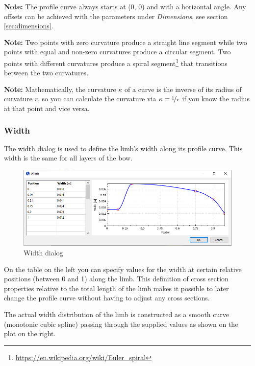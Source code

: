 \documentclass[12pt]{article}
\begin{document}
\bigskip

\textbf{Note:} The profile curve always starts at (0, 0) and with a horizontal angle.
Any offsets can be achieved with the parameters under \textit{Dimensions}, see section \ref{sec:dimensions}.

\bigskip

\textbf{Note:} Two points with zero curvature produce a straight line segment while two points with equal and non-zero curvatures produce a circular segment. Two points with different curvatures produce a spiral segment\footnote{\url{https://en.wikipedia.org/wiki/Euler_spiral}} that transitions between the two curvatures.

\bigskip

\textbf{Note:} Mathematically, the curvature $\kappa$ of a curve is the inverse of its radius of curvature $r$, so you can calculate the curvature via $\kappa = \nicefrac{1}{r}$ if you know the radius at that point and vice versa.

\newpage
\subsubsection{Width}

The width dialog is used to define the limb's width along its profile curve. This width is the same for all layers of the bow.

\bigskip

\begin{figure}[H]
\centering
\includegraphics[width=\textwidth]{figures/screenshots/input/width}
\caption{Width dialog}
\label{fig:width}
\end{figure}

On the table on the left you can specify values for the width at certain relative positions (between 0 and 1) along the limb. This definition of cross section properties relative to the total length of the limb makes it possible to later change the profile curve without having to adjust any cross sections.

The actual width distribution of the limb is constructed as a smooth curve (monotonic cubic spline) passing through the supplied values as shown on the plot on the right.
\end{document}
